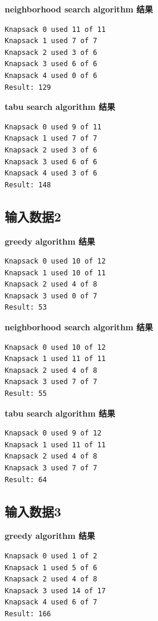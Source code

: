 \documentclass[UTF8]{ctexart}
\begin{document}
\noindent
\textbf{neighborhood search algorithm 结果}

\begin{lstlisting}[numbers=none]
Knapsack 0 used 11 of 11
Knapsack 1 used 7 of 7
Knapsack 2 used 3 of 6
Knapsack 3 used 6 of 6
Knapsack 4 used 0 of 6
Result: 129
\end{lstlisting}

\noindent
\textbf{tabu search algorithm 结果}

\begin{lstlisting}[numbers=none]
Knapsack 0 used 9 of 11
Knapsack 1 used 7 of 7
Knapsack 2 used 3 of 6
Knapsack 3 used 6 of 6
Knapsack 4 used 3 of 6
Result: 148
\end{lstlisting}

\newpage
\subsection{输入数据2}


\noindent
\textbf{greedy algorithm 结果}

\begin{lstlisting}[numbers=none]
Knapsack 0 used 10 of 12
Knapsack 1 used 10 of 11
Knapsack 2 used 4 of 8
Knapsack 3 used 0 of 7
Result: 53
\end{lstlisting}

\noindent
\textbf{neighborhood search algorithm 结果}

\begin{lstlisting}[numbers=none]
Knapsack 0 used 10 of 12
Knapsack 1 used 11 of 11
Knapsack 2 used 4 of 8
Knapsack 3 used 7 of 7
Result: 55
\end{lstlisting}

\noindent
\textbf{tabu search algorithm 结果}

\begin{lstlisting}[numbers=none]
Knapsack 0 used 9 of 12
Knapsack 1 used 11 of 11
Knapsack 2 used 4 of 8
Knapsack 3 used 7 of 7
Result: 64
\end{lstlisting}

\newpage
\subsection{输入数据3}


\noindent
\textbf{greedy algorithm 结果}

\begin{lstlisting}[numbers=none]
Knapsack 0 used 1 of 2
Knapsack 1 used 5 of 6
Knapsack 2 used 4 of 8
Knapsack 3 used 14 of 17
Knapsack 4 used 6 of 7
Result: 166
\end{lstlisting}
\end{document}
